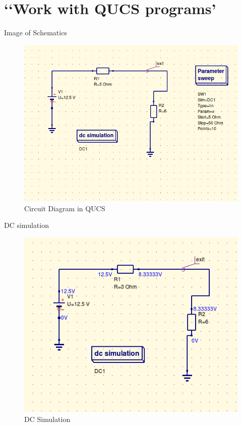 \documentclass{report}
\begin{document}
\section{‘‘Work with QUCS programs'}

Image of Schematics
\begin{figure}[hbt!]
 \centering
 \caption{Circuit Diagram in QUCS}
\includegraphics[width=\textwidth]{03.png}
 \end{figure}
 
DC simulation
\begin{figure}[hbt!]
 \centering
 \caption{DC Simulation}
\includegraphics[width=\textwidth]{05.png}
 \end{figure}
 
\end{document}
